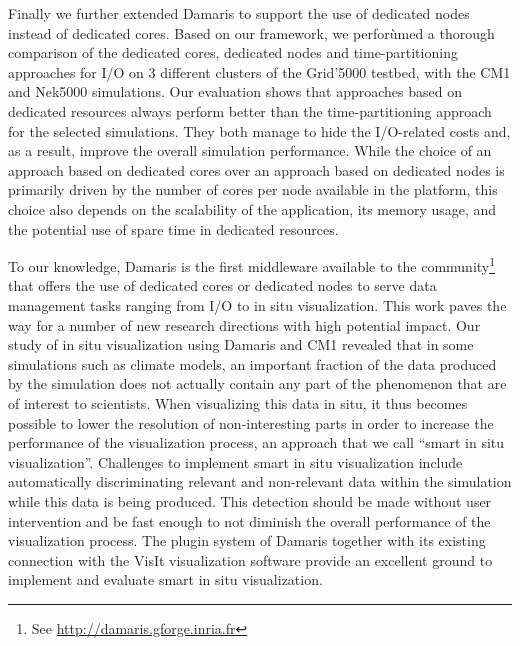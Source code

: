 			Finally we further extended Damaris to support the use of dedicated nodes instead
			of dedicated cores. Based on our framework, we perforùmed a thorough comparison
			of the dedicated cores, dedicated nodes and time-partitioning approaches for I/O
			on 3 different clusters of the Grid'5000 testbed, with the CM1 and Nek5000 simulations.
			Our evaluation shows that approaches based on dedicated resources always perform
			better than the time-partitioning approach for the selected simulations. They both manage
			to hide the I/O-related costs and, as a result, improve the overall simulation performance.
			While the choice of an approach based on dedicated cores over an approach based on
			dedicated nodes is primarily driven by the number of cores per node available in the 
			platform, this choice also depends on the scalability of the application, its memory usage,
			and the potential use of spare time in dedicated resources.
			
To our knowledge, Damaris is the first middleware available to the community\footnote{See \url{http://damaris.gforge.inria.fr}}  
that offers the use of dedicated cores or dedicated nodes to serve data management tasks ranging from
I/O to in situ visualization. This work paves the way for a number of new research directions with high potential impact. 
Our study of in situ visualization using Damaris and CM1 revealed that in some simulations
		such as climate models, an important fraction of the data produced by the simulation does not actually
		contain any part of the phenomenon that are of interest to scientists. When visualizing this data
		in situ, it thus becomes possible to lower the resolution of non-interesting parts in order
		to increase the performance of the visualization process, an approach that we call ``smart in situ visualization''.
		Challenges to implement smart in situ visualization include automatically discriminating relevant and non-relevant
		data within the simulation while this data is being produced. This detection should be made without
		user intervention and be fast enough to not diminish the overall performance of the visualization process.
		The plugin system of Damaris together with its existing connection with the VisIt visualization software 
		provide an excellent ground to implement and evaluate smart in situ visualization.
	

